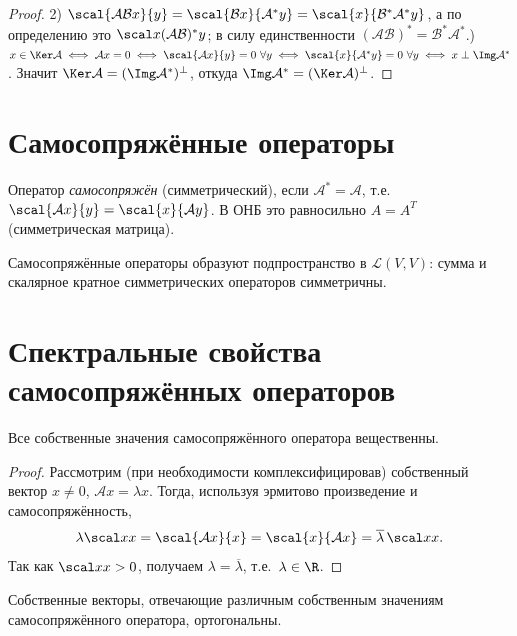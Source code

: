 \begin{proof}
2) $\scal{\mathcal A\mathcal Bx}{y}=\scal{\mathcal Bx}{\mathcal A^*y}=\scal{x}{\mathcal B^*\mathcal A^*y}$,
а по определению это $\scal x{(\mathcal A\mathcal B)^*y}$; в силу единственности
$(\mathcal A\mathcal B)^*=\mathcal B^*\mathcal A^*$.) $x\in\Ker\mathcal A\iff\mathcal Ax=0\iff\scal{\mathcal Ax}{y}=0\ \forall y
\iff\scal{x}{\mathcal A^*y}=0\ \forall y\iff x\perp\Img\mathcal A^*$. Значит
$\Ker\mathcal A=(\Img\mathcal A^*)^\perp$, откуда $\Img\mathcal A^*=(\Ker\mathcal A)^\perp$.
\end{proof}

\section{Самосопряжённые операторы}

\begin{definition}
Оператор \emph{самосопряжён} (симметрический), если $\mathcal A^*=\mathcal A$, т.е.\
$\scal{\mathcal Ax}{y}=\scal{x}{\mathcal Ay}$. В ОНБ это равносильно $A=A^{T}$ (симметрическая
матрица).
\end{definition}

\begin{remark}
Самосопряжённые операторы образуют подпространство в $\mathcal L(V,V)$: сумма и скалярное кратное
симметрических операторов симметричны.
\end{remark}

\section{Спектральные свойства самосопряжённых операторов}

\begin{theorem}
Все собственные значения самосопряжённого оператора вещественны.
\end{theorem}

\begin{proof}
Рассмотрим (при необходимости комплексифицировав) собственный вектор $x\ne0$, $\mathcal Ax=\lambda x$.
Тогда, используя эрмитово произведение и самосопряжённость,
\[
  \lambda\scal xx=\scal{\mathcal Ax}{x}=\scal{x}{\mathcal Ax}=\overline\lambda\,\scal xx .
\]
Так как $\scal xx>0$, получаем $\lambda=\overline\lambda$, т.е.\ $\lambda\in\R$.
\end{proof}

\begin{theorem}
Собственные векторы, отвечающие различным собственным значениям самосопряжённого оператора,
ортогональны.
\end{theorem}


